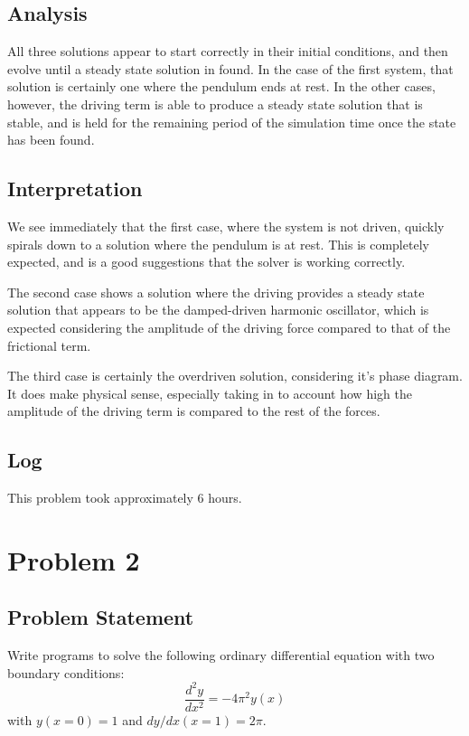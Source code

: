 \documentclass[10pt,letter]{article}
\begin{document}
\pagebreak

\subsection{Analysis}
All three solutions appear to start correctly in their initial conditions, and then evolve until a steady state solution in found. In the case of the first system, that solution is certainly one where the pendulum ends at rest. In the other cases, however, the driving term is able to produce a steady state solution that is stable, and is held for the remaining period of the simulation time once the state has been found.

\subsection{Interpretation}

We see immediately that the first case, where the system is not driven, quickly spirals down to a solution where the pendulum is at rest. This is completely expected, and is a good suggestions that the solver is working correctly.

The second case shows a solution where the driving provides a steady state solution that appears to be the damped-driven harmonic oscillator, which is expected considering the amplitude of the driving force compared to that of the frictional term.

The third case is certainly the overdriven solution, considering it's phase diagram. It does make physical sense, especially taking in to account how high the amplitude of the driving term is compared to the rest of the forces.

\subsection{Log}

This problem took approximately 6 hours.

\section{Problem 2}

\subsection{Problem Statement}

Write programs to solve the following ordinary differential equation with two boundary conditions:
$$\frac{d^2y}{dx^2} = -4\pi^2y(x)$$
with $y(x=0) = 1$ and $dy/dx(x=1)=2\pi$.
\end{document}
